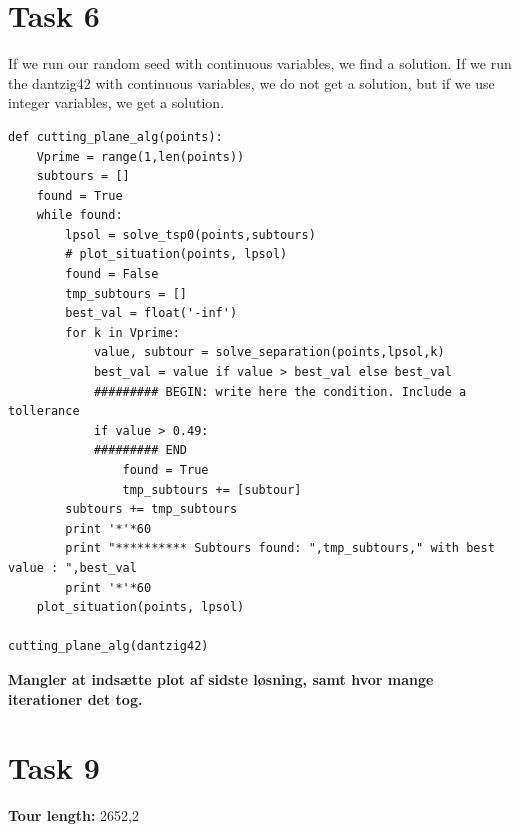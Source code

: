 \documentclass[a4paper,10pt]{article}
\begin{document}
\newpage
\section*{Task 6}

If we run our random seed with continuous variables, we find a solution. If we run the dantzig42 with continuous variables, we do not get a solution, but if we use integer variables, we get a solution. 

\begin{lstlisting}
def cutting_plane_alg(points):
    Vprime = range(1,len(points))
    subtours = []
    found = True
    while found:
        lpsol = solve_tsp0(points,subtours)
        # plot_situation(points, lpsol)
        found = False
        tmp_subtours = []
        best_val = float('-inf')
        for k in Vprime:
            value, subtour = solve_separation(points,lpsol,k)
            best_val = value if value > best_val else best_val
            ######### BEGIN: write here the condition. Include a tollerance
            if value > 0.49: 
            ######### END
                found = True
                tmp_subtours += [subtour]
        subtours += tmp_subtours
        print '*'*60
        print "********** Subtours found: ",tmp_subtours," with best value : ",best_val
        print '*'*60
    plot_situation(points, lpsol)
    
cutting_plane_alg(dantzig42)
\end{lstlisting}

\textbf{Mangler at indsætte plot af sidste løsning, samt hvor mange iterationer det tog.}

\newpage
\section*{Task 9}

\textbf{Tour length:} 2652,2
\end{document}
